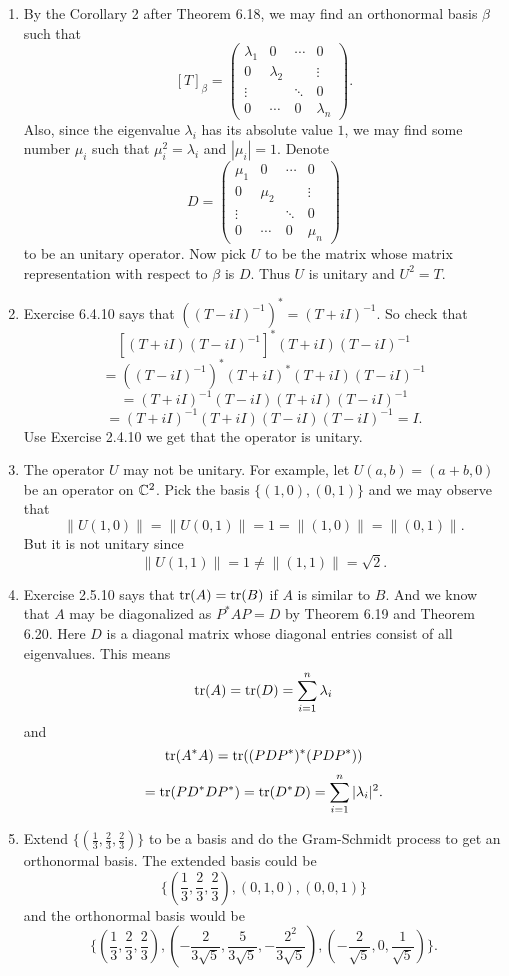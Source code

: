 \begin{enumerate}
\item By the Corollary 2 after Theorem 6.18, we may find an orthonormal basis $\beta $ such that 
\[[T]_{\beta}=\begin{pmatrix}\lambda_1&0&\cdots &0\\0&\lambda_2& &\vdots\\ \vdots &&\ddots &0\\0&\cdots &0&\lambda_n\end{pmatrix}.\]
Also, since the eigenvalue $\lambda_i$ has its absolute value $1$, we may find some number $\mu_i$ such that $\mu_i^2=\lambda_i$ and $|\mu_i|=1$. Denote 
\[D=\begin{pmatrix}\mu_1&0&\cdots &0\\0&\mu_2& &\vdots\\ \vdots &&\ddots &0\\0&\cdots &0&\mu_n\end{pmatrix}\]
to be an unitary operator. Now pick $U$ to be the matrix whose matrix representation with respect to $\beta $ is $D$. Thus $U$ is unitary and $U^2=T$.
\item Exercise 6.4.10 says that $((T-iI)^{-1})^* = (T+iI)^{-1}$. So check that 
\[[(T+iI)(T-iI)^{-1}]^*(T+iI)(T-iI)^{-1}\]
\[=((T-iI)^{-1})^*(T+iI)^*(T+iI)(T-iI)^{-1}\]
\[=(T+iI)^{-1}(T-iI)(T+iI)(T-iI)^{-1}\]
\[=(T+iI)^{-1}(T+iI)(T-iI)(T-iI)^{-1}=I.\]
Use Exercise 2.4.10 we get that the operator is unitary.
\item The operator $U$ may not be unitary. For example, let $U(a,b)=(a+b,0)$ be an operator on $\mathbb{C}^2$. Pick the basis $\{(1,0),(0,1)\}$ and we may observe that 
\[\|U(1,0)\|=\|U(0,1)\|=1=\|(1,0)\|=\|(0,1)\|.\]
But it is not unitary since 
\[\|U(1,1)\|=1\neq \|(1,1)\|=\sqrt{2}.\]
\item Exercise 2.5.10 says that $\operatorname{tr}(A)=\operatorname{tr}(B)$ if $A$ is similar to $B$. And we know that $A$ may be diagonalized as $P^*AP=D$ by Theorem 6.19 and Theorem 6.20. Here $D$ is a diagonal matrix whose diagonal entries consist of all eigenvalues. This means 
\[\operatorname{tr}(A)=\operatorname{tr}(D)=\sum_{i=1}^n{\lambda_i}\]
and 
\[\operatorname{tr}(A^*A)=\operatorname{tr}((PDP^*)^*(PDP^*))\]
\[=\operatorname{tr}(PD^*DP^*)=\operatorname{tr}(D^*D)=\sum_{i=1}^n{|\lambda_i|^2}.\]
\item Extend $\{(\frac{1}{3},\frac{2}{3},\frac{2}{3})\}$ to be a basis and do the Gram-Schmidt process to get an orthonormal basis. The extended basis could be 
\[\{(\frac{1}{3},\frac{2}{3},\frac{2}{3}),(0,1,0),(0,0,1)\}\]
and the orthonormal basis would be 
\[\{(\frac{1}{3},\frac{2}{3},\frac{2}{3}),(-\frac{2}{3\sqrt{5}},\frac{5}{3\sqrt{5}},-\frac{{2}^{2}}{3\sqrt{5}}),(-\frac{2}{\sqrt{5}},0,\frac{1}{\sqrt{5}})\}.\]

\end{enumerate}
